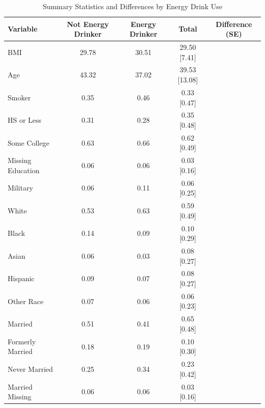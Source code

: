 \begin{table}[htbp]
\centering
\caption{Summary Statistics and Differences by Energy Drink Use}
\label{tab:energy_summary}
\begin{tabular}{lcccc}
\toprule
\textbf{Variable} & \textbf{Not Energy Drinker} & \textbf{Energy Drinker} & \textbf{Total} & \textbf{Difference (SE)} \\
\midrule
BMI & 29.78 & 30.51 & 29.50 [7.41] & \\
Age & 43.32 & 37.02 & 39.53 [13.08] & \\
Smoker & 0.35 & 0.46 & 0.33 [0.47] & \\
HS or Less & 0.31 & 0.28 & 0.35 [0.48] & \\
Some College & 0.63 & 0.66 & 0.62 [0.49] & \\
Missing Education & 0.06 & 0.06 & 0.03 [0.16] & \\
Military & 0.06 & 0.11 & 0.06 [0.25] & \\
White & 0.53 & 0.63 & 0.59 [0.49] & \\
Black & 0.14 & 0.09 & 0.10 [0.29] & \\
Asian & 0.06 & 0.03 & 0.08 [0.27] & \\
Hispanic & 0.09 & 0.07 & 0.08 [0.27] & \\
Other Race & 0.07 & 0.06 & 0.06 [0.23] & \\
Married & 0.51 & 0.41 & 0.65 [0.48] & \\
Formerly Married & 0.18 & 0.19 & 0.10 [0.30] & \\
Never Married & 0.25 & 0.34 & 0.23 [0.42] & \\
Married Missing & 0.06 & 0.06 & 0.03 [0.16] & \\
\bottomrule
\end{tabular}
\end{table}

